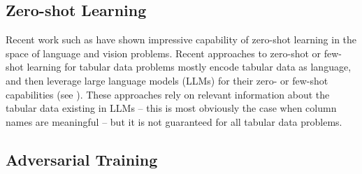 
\subsection{Zero-shot Learning}







Recent work such as \citet{xian2018zero, Xian_2017_CVPR, chang2008importance, larochelle2008zero, palatucci2009zero} have shown impressive capability of zero-shot learning in the space of language and vision problems. Recent approaches to zero-shot or few-shot learning for tabular data problems mostly encode tabular data as language, and then leverage large language models (LLMs) for their zero- or few-shot capabilities (see \citet{pmlr-v206-hegselmann23a, nam2023stunt, gardner2024largescaletransferlearning}). These approaches rely on relevant information about the tabular data existing in LLMs -- this is most obviously the case when column names are meaningful -- but it is not guaranteed for all tabular data problems.


\subsection{Adversarial Training} 

